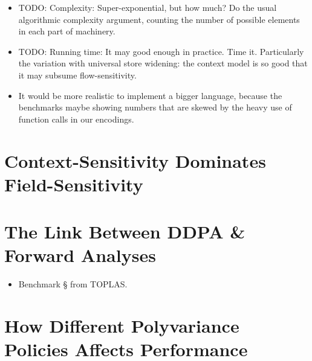 \documentclass[12pt, oneside]{book}
\begin{document}
\begin{itemize}
  \item TODO: Complexity: Super-exponential, but how much? Do the usual algorithmic complexity argument, counting the number of possible elements in each part of machinery.
  \item TODO: Running time: It may good enough in practice. Time it. Particularly the variation with universal store widening: the context model is so good that it may subsume flow-sensitivity.
  \item It would be more realistic to implement a bigger language, because the benchmarks maybe showing numbers that are skewed by the heavy use of function calls in our encodings.
\end{itemize}

\section{Context-Sensitivity Dominates Field-Sensitivity}

\section{The Link Between DDPA \& Forward Analyses}

\begin{itemize}
  \item Benchmark § from TOPLAS.
\end{itemize}

\section{How Different Polyvariance Policies Affects Performance}
\end{document}
